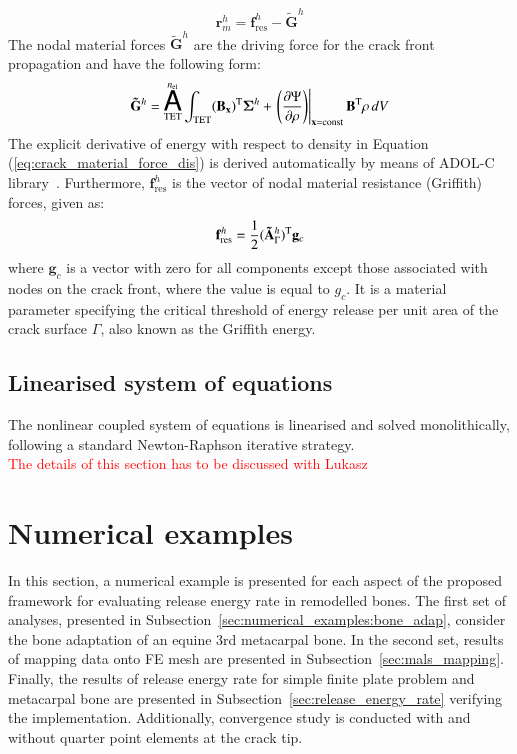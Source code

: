 \documentclass[11pt]{acmeArticle}
\DeclareMathOperator*{\aoperator}{ \text{\huge${\mathsf{A}}$}}
\numberwithin{equation}{section}
\begin{document}
\begin{equation}
\mathbf r_m^h = \mathbf f^h_{\text{res}} - \mathbf{\tilde G}^h
\end{equation}
The nodal material forces $\mathbf{\tilde G}^h$ are the driving force for the crack front propagation and have the following form:
\begin{equation}\label{eq:crack_material_force_dis}
\mathbf{\tilde G}^h = \aoperator_{\text{TET}}^{n_{\rm {el}}} \int_\text{TET} (\mathbf{B_x})^{\rm T} {\bm {\Sigma}}^h +   \left.\left( \frac{\partial \Psi}{\partial \rho} \right)\right|_{\mathbf{x}= \text {const}} \mathbf B^{\rm T} \rho \mathrm \,d V
\end{equation}
The explicit derivative of energy with respect to density in Equation (\ref{eq:crack_material_force_dis}) is derived automatically by means of ADOL-C library~\citep{Walther2009}. 
Furthermore, $\mathbf f^h_{\text {res}}$ is the vector of nodal material resistance (Griffith) forces, given as:
\begin{equation}
\mathbf f^h_{\text{res}} = \frac{1}{2} (\mathbf{\tilde A}^h_\Gamma)^{\rm T} \mathbf g_c
\end{equation}
where $ \mathbf g_c$ is a vector with zero for all components except those associated with nodes on the crack front, where the value is equal to $g_c$. 
It is a material parameter specifying the critical threshold of energy release per unit area of the crack surface $\Gamma$, also known as the Griffith energy.
\subsection{Linearised system of equations}
The nonlinear coupled system of equations is linearised and solved monolithically, following a standard Newton-Raphson iterative strategy. \\

\textcolor{red}{The details of this section has to be discussed with Lukasz}

\section{Numerical examples}
\label{sec:numerical_examples}
In this section, a numerical example is presented for each aspect of the proposed framework for evaluating release energy rate in remodelled bones. 
The first set of analyses, presented in Subsection~\ref{sec:numerical_examples:bone_adap}, consider the bone adaptation of an equine 3rd metacarpal bone. 
In the second set, results of mapping data onto FE mesh are presented in Subsection~\ref{sec:mals_mapping}. 
Finally, the results of release energy rate for simple finite plate problem and metacarpal bone are presented in Subsection~\ref{sec:release_energy_rate} verifying the implementation. 
Additionally, convergence study is conducted with and without quarter point elements at the crack tip.
\end{document}
